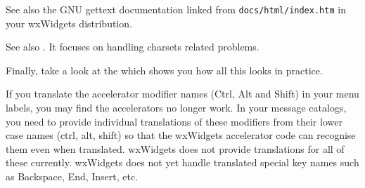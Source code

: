See also the GNU gettext documentation linked from {\tt docs/html/index.htm} in
your wxWidgets distribution.

See also .
It focuses on handling charsets related problems.

Finally, take a look at the  which shows
you how all this looks in practice.


If you translate the accelerator modifier names (Ctrl, Alt and Shift) in your menu labels, you may find
the accelerators no longer work. In your message catalogs, you need to provide individual translations
of these modifiers from their lower case names (ctrl, alt, shift) so that the wxWidgets accelerator
code can recognise them even when translated. wxWidgets does not provide translations for all of these
currently. wxWidgets does not yet handle translated special key names such as Backspace,
End, Insert, etc.

